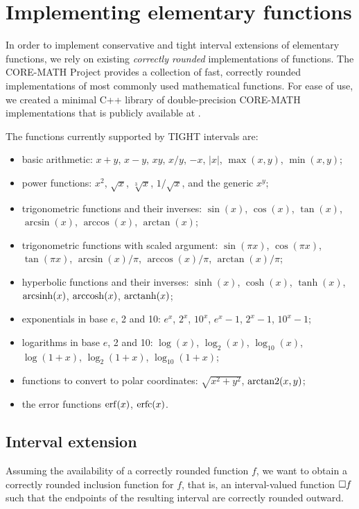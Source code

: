 
\section{Implementing elementary functions}
\label{sec:functions}
In order to implement conservative and tight interval extensions of elementary functions, we rely on existing \emph{correctly rounded} implementations of functions.
The CORE-MATH Project \cite{Sibidanov2022} provides a collection of fast, correctly rounded implementations of most commonly used mathematical functions.
For ease of use, we created a minimal C++ library of double-precision CORE-MATH implementations that is publicly available at \url{}.

The functions currently supported by TIGHT intervals are:
\begin{itemize}
	\item basic arithmetic: $x+y$, $x-y$, $xy$, $x/y$, $-x$, $|x|$, $\max(x,y)$, $\min(x,y)$;
	\item power functions: $x^2$, $\sqrt{x}$, $\sqrt[3]{x}$, $1/\sqrt{x}$, and the generic $x^y$;
	\item trigonometric functions and their inverses: $\sin(x)$, $\cos(x)$, $\tan(x)$, $\arcsin(x)$, $\arccos(x)$, $\arctan(x)$;
	\item trigonometric functions with scaled argument: $\sin(\pi x)$, $\cos(\pi x)$, $\tan(\pi x)$, $\arcsin(x)/\pi$, $\arccos(x)/\pi$, $\arctan(x)/\pi$;
	\item hyperbolic functions and their inverses: $\sinh(x)$, $\cosh(x)$, $\tanh(x)$, $\operatorname{arcsinh}(x)$, $\operatorname{arccosh}(x)$, $\operatorname{arctanh}(x)$;
	\item exponentials in base $e$, 2 and 10: $e^x$, $2^x$, $10^x$, $e^x-1$, $2^x-1$, $10^x-1$;
	\item logarithms in base $e$, 2 and 10: $\log(x)$, $\log_2(x)$, $\log_{10}(x)$, $\log(1+x)$, $\log_2(1+x)$, $\log_{10}(1+x)$;
	\item functions to convert to polar coordinates: $\sqrt{x^2+y^2}$, $\operatorname{arctan2}(x,y)$;
	\item the error functions $\operatorname{erf}(x)$, $\operatorname{erfc}(x)$.
\end{itemize}

\subsection{Interval extension}
Assuming the availability of a correctly rounded function $f$, we want to obtain a correctly rounded inclusion function for $f$, that is, an interval-valued function $\Box f$ such that the endpoints of the resulting interval are correctly rounded outward.


